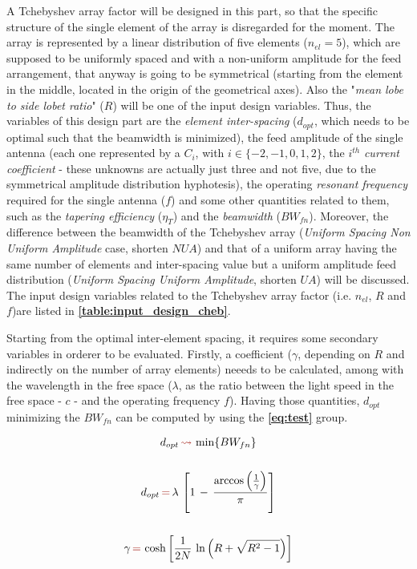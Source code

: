 \documentclass[10pt,a4paper,twocolumn]{article}
\begin{document}
{\indent A Tchebyshev array factor will be designed in this part, so that the specific structure of the single element of the array is disregarded for the moment. The array is represented by a linear distribution of five elements ($n_{el}=5$), which are supposed to be uniformly spaced and with a non-uniform amplitude for the feed arrangement, that anyway is going to be symmetrical (starting from the element in the middle, located in the origin of the geometrical axes). Also the "\emph{mean lobe to side lobet ratio}" ($R$) will be one of the input design variables. Thus, the variables of this design part are the \emph{element inter-spacing} ($d_{opt}$, which needs to be optimal such that the beamwidth is minimized), the feed amplitude of the single antenna (each one represented by a $C_i$, with $i\in\{-2,-1,0,1,2\}$, the $i^{th}$ \emph{current coefficient} - these unknowns are actually just three and not five, due to the symmetrical amplitude distribution hyphotesis), the operating \emph{resonant frequency} required for the single antenna ($f$) and some other quantities related to them, such as the \emph{tapering efficiency} ($\eta_T$) and the \emph{beamwidth} ($BW_{fn}$). Moreover, the difference between the beamwidth of the Tchebyshev array (\emph{Uniform Spacing Non Uniform Amplitude} case, shorten $NUA$) and  that of a uniform array having the same number of elements and inter-spacing value but a uniform amplitude feed distribution  (\emph{Uniform Spacing Uniform Amplitude}, shorten $UA$) will be discussed. The input design variables related to the Tchebyshev array factor (i.e. $n_{el}$, $R$ and $f$)are listed in \textbf{\cref{table:input_design_cheb}}. 

\indent 

Starting from the optimal inter-element spacing, it requires some secondary variables in orderer to be evaluated. Firstly, a coefficient ($\gamma$, depending on $R$ and indirectly on the number of array elements) neeeds to be calculated, among with the wavelength in the free space ($\lambda$, as the ratio between the light speed in the free space - $c$ - and the operating frequency $f$). Having those quantities, $d_{opt}$ minimizing the $BW_{fn}$ can be computed by using the \textbf{\cref{eq:test}} group. 

{\begin{equation}
		\begin{gathered}
			d_{opt}\,{\color{Mahogany}\leadsto}\,\min\{BW_{fn}\}\\
			\\
			d_{opt}\,{\color{Mahogany}=}\,\lambda\,\left[1\,-\,\frac{\arccos\left(\frac{1}{\gamma}\right)}{\pi}\right]\\
			\\
			\gamma\,{\color{Mahogany}=}\,\cosh\left[\frac{1}{2N}\,\ln\left(R+\sqrt{R^2-1}\right)\right]
		\end{gathered}
		\label{eq:test}
	\end{equation}
}


}
\end{document}
